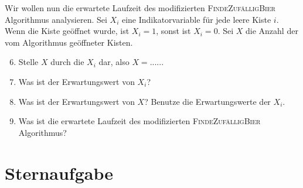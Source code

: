 \documentclass{uebung_cs}
\begin{document}
\begin{aufgabe}[Bierkisten]
	Wir wollen nun die erwartete Laufzeit des modifizierten \textsc{FindeZufälligBier} Algorithmus analysieren. Sei $X_i$ eine Indikatorvariable für jede leere Kiste $i$. Wenn die Kiste geöffnet wurde, ist $X_i = 1$, sonst ist $X_i = 0$. Sei $X$ die Anzahl der vom Algorithmus geöffneter Kisten.
		
	\begin{enumerate}
		\setcounter{enumi}{5}
		\item Stelle $X$ durch die $X_i$ dar, also $X = ......$\\
		\item Was ist der Erwartungswert von $X_i$?\\
		\item Was ist der Erwartungswert von $X$? Benutze die Erwartungswerte der $X_i$.\\
		\item Was ist die erwartete Laufzeit des modifizierten \textsc{FindeZufälligBier} Algorithmus?
	\end{enumerate}
\end{aufgabe}

\section*{Sternaufgabe}

\begin{aufgabe}
	
\end{aufgabe}
\end{document}
